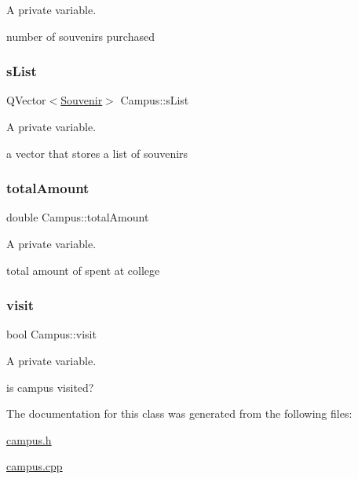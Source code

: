 A private variable. 

number of souvenirs purchased \mbox{\label{class_campus_a9223f6e8d47eaf31cb611629a14ac855}} 
\subsubsection{\texorpdfstring{s\+List}{sList}}
{\footnotesize\ttfamily Q\+Vector$<$\hyperlink{class_souvenir}{Souvenir}$>$ Campus\+::s\+List\hspace{0.3cm}{\ttfamily [private]}}



A private variable. 

a vector that stores a list of souvenirs \mbox{\label{class_campus_aa487dfe37b790362d7c7ee35d0806544}} 
\subsubsection{\texorpdfstring{total\+Amount}{totalAmount}}
{\footnotesize\ttfamily double Campus\+::total\+Amount\hspace{0.3cm}{\ttfamily [private]}}



A private variable. 

total amount of spent at college \mbox{\label{class_campus_aa569a21d95e1b865b6bf6c2961a9630a}} 
\subsubsection{\texorpdfstring{visit}{visit}}
{\footnotesize\ttfamily bool Campus\+::visit\hspace{0.3cm}{\ttfamily [private]}}



A private variable. 

is campus visited? 

The documentation for this class was generated from the following files\+:\begin{DoxyCompactItemize}
\item 
\hyperlink{campus_8h}{campus.\+h}\item 
\hyperlink{campus_8cpp}{campus.\+cpp}\end{DoxyCompactItemize}
